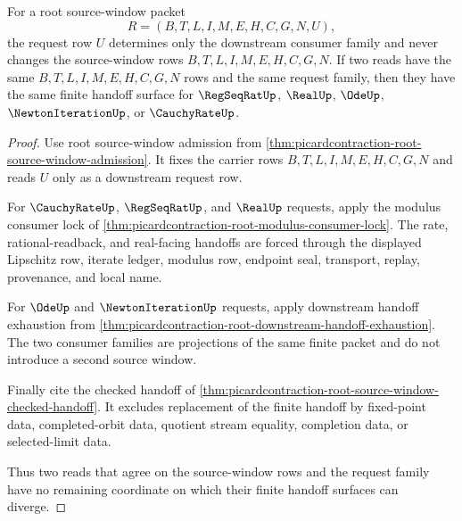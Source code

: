 \begin{theorem}
\label{thm:picard-contraction-root-source-window-determinacy}
For a root source-window packet
$$
R=(B,T,L,I,M,E,H,C,G,N,U),
$$
the request row $U$ determines only the downstream consumer family and never changes the source-window rows $B,T,L,I,M,E,H,C,G,N$. If two reads have the same $B,T,L,I,M,E,H,C,G,N$ rows and the same request family, then they have the same finite handoff surface for $\RegSeqRatUp$, $\RealUp$, $\OdeUp$, $\NewtonIterationUp$, or $\CauchyRateUp$.
\end{theorem}
\begin{proof}
Use root source-window admission from \autoref{thm:picardcontraction-root-source-window-admission}. It fixes the carrier rows $B,T,L,I,M,E,H,C,G,N$ and reads $U$ only as a downstream request row.

For $\CauchyRateUp$, $\RegSeqRatUp$, and $\RealUp$ requests, apply the modulus consumer lock of \autoref{thm:picardcontraction-root-modulus-consumer-lock}. The rate, rational-readback, and real-facing handoffs are forced through the displayed Lipschitz row, iterate ledger, modulus row, endpoint seal, transport, replay, provenance, and local name.

For $\OdeUp$ and $\NewtonIterationUp$ requests, apply downstream handoff exhaustion from \autoref{thm:picardcontraction-root-downstream-handoff-exhaustion}. The two consumer families are projections of the same finite packet and do not introduce a second source window.

Finally cite the checked handoff of \autoref{thm:picardcontraction-root-source-window-checked-handoff}. It excludes replacement of the finite handoff by fixed-point data, completed-orbit data, quotient stream equality, completion data, or selected-limit data.

Thus two reads that agree on the source-window rows and the request family have no remaining coordinate on which their finite handoff surfaces can diverge.
\end{proof}
